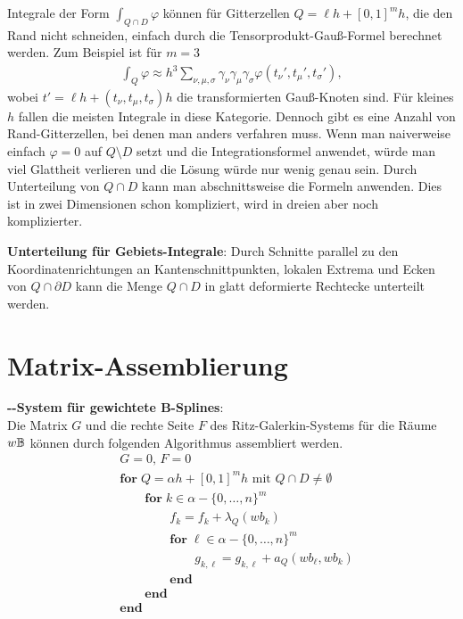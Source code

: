 Integrale der Form $\int_{Q \cap D} \varphi$ können für Gitterzellen $Q = \ell h + [0, 1]^m h$,
die den Rand nicht schneiden, einfach durch die Tensorprodukt-Gauß-Formel berechnet werden.
Zum Beispiel ist für $m = 3$
\begin{align*}
    \int_Q \varphi
    \approx h^3 \sum_{\nu,\mu,\sigma} \gamma_\nu \gamma_\mu \gamma_\sigma
    \varphi(t_\nu', t_\mu', t_\sigma'),
\end{align*}
wobei $t' = \ell h + (t_\nu, t_\mu, t_\sigma) h$ die transformierten Gauß-Knoten sind.
Für kleines $h$ fallen die meisten Integrale in diese Kategorie.
Dennoch gibt es eine Anzahl von Rand-Gitterzellen, bei denen man anders verfahren muss.
Wenn man naiverweise einfach $\varphi = 0$ auf $Q \setminus D$ setzt und die Integrationsformel
anwendet, würde man viel Glattheit verlieren und die Lösung würde nur wenig genau sein.
Durch Unterteilung von $Q \cap D$ kann man abschnittsweise die Formeln anwenden.
Dies ist in zwei Dimensionen schon kompliziert, wird in dreien aber noch komplizierter.

\textbf{Unterteilung für Gebiets-Integrale}:
Durch Schnitte parallel zu den Koordinatenrichtungen an Kantenschnittpunkten,
lokalen Extrema und Ecken von $Q \cap \partial D$ kann die Menge $Q \cap D$ in
glatt deformierte Rechtecke unterteilt werden.

\pagebreak

\section{%
    Matrix-Assemblierung%
}

\textbf{--System für gewichtete B-Splines}:\\
Die Matrix $G$ und die rechte Seite $F$ des Ritz-Galerkin-Systems für die Räume $w\mathbb{B}$
können durch folgenden Algorithmus assembliert werden.
\begin{align*}
    &G = 0,\, F = 0\\
    &\mathbf{for}\; Q = \alpha h + [0, 1]^m h \text{ mit } Q \cap D \not= \emptyset\\
    &\qquad\mathbf{for}\; k \in \alpha - \{0, \dotsc, n\}^m\\
    &\qquad\qquad f_k = f_k + \lambda_Q(w b_k)\\
    &\qquad\qquad\mathbf{for}\; \ell \in \alpha - \{0, \dotsc, n\}^m\\
    &\qquad\qquad\qquad g_{k,\ell} = g_{k,\ell} + a_Q(w b_\ell, w b_k)\\
    &\qquad\qquad\mathbf{end}\\
    &\qquad\mathbf{end}\\
    &\mathbf{end}
\end{align*}

